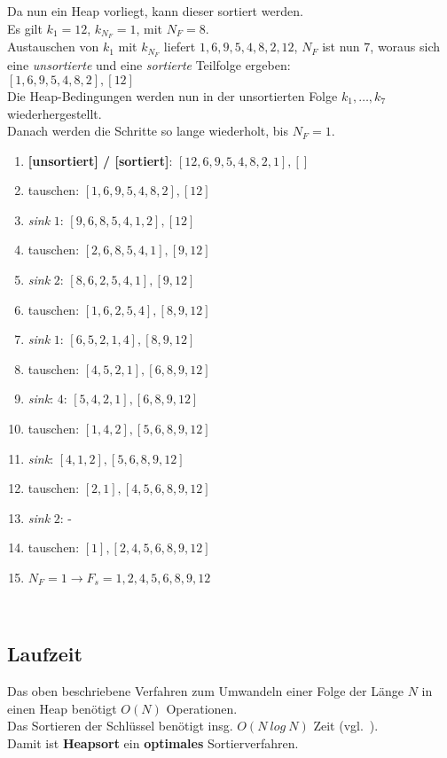 \noindent
Da nun ein Heap vorliegt, kann dieser sortiert werden.\\
Es gilt $k_1 = 12$, $k_{N_F} = 1$, mit $N_F = 8$.\\
Austauschen von $k_1$ mit $k_{N_F}$ liefert $1, 6, 9, 5, 4, 8, 2, 12$, $N_F$ ist nun $7$, woraus sich eine \textit{unsortierte} und eine \textit{sortierte} Teilfolge ergeben:\\
$[1, 6, 9, 5, 4, 8, 2], [12]$
\\
Die Heap-Bedingungen werden nun in der unsortierten Folge $k_1, \ldots, k_7$ wiederhergestellt.\\
Danach werden die Schritte so lange wiederholt, bis $N_F = 1$.\\

\begin{enumerate}
    \item \textbf{[unsortiert] / [sortiert]}: $[12, 6, 9, 5, 4, 8, 2, 1], []$
    \item tauschen: $[1, 6, 9, 5, 4, 8, 2], [12]$
    \item \textit{sink} $1$: $[9, 6, 8, 5, 4, 1, 2], [12]$
    \item tauschen: $[2, 6, 8, 5, 4, 1], [9, 12]$
    \item \textit{sink} $2$: $[8, 6, 2, 5, 4, 1], [9, 12]$
    \item tauschen: $[1, 6, 2, 5, 4], [8, 9, 12]$
    \item \textit{sink} $1$: $[6, 5, 2, 1, 4], [8, 9, 12]$
    \item tauschen: $[4, 5, 2, 1], [6, 8, 9, 12]$
    \item \textit{sink}: $4$: $[5, 4, 2, 1], [6, 8, 9, 12]$
    \item tauschen: $[1, 4, 2], [5, 6, 8, 9, 12]$
    \item \textit{sink}: $[4, 1, 2], [5, 6, 8, 9, 12]$
    \item tauschen: $[2, 1], [4, 5, 6, 8, 9, 12]$
    \item \textit{sink} $2$: -
    \item tauschen: $[1], [2, 4, 5, 6, 8, 9, 12]$
    \item $N_F=1 \rightarrow F_s= 1, 2, 4, 5, 6, 8, 9, 12$
\end{enumerate}\\

\subsection{Laufzeit}
Das oben beschriebene Verfahren zum Umwandeln einer Folge der Länge $N$ in einen Heap benötigt $O(N)$ Operationen.\\
Das Sortieren der Schlüssel benötigt insg. $O(N\ log\ N)$ Zeit (vgl.~\cite[112]{OW17b}).\\

\noindent
Damit ist \textbf{Heapsort} ein \textbf{optimales} Sortierverfahren.
